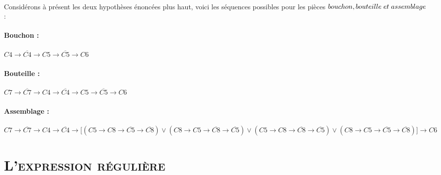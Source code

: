 		\paragraph{}
		Considérons à présent les deux hypothèses énoncées plus haut, voici les séquences possibles pour les pièces $bouchon, bouteille \hspace{1mm} et \hspace{1mm}  assemblage$ :
		\paragraph{Bouchon :}
		$C4 \rightarrow \overline{C4} \rightarrow C5 \rightarrow \overline{C5} \rightarrow C6$
		\paragraph{Bouteille :}
		$C7 \rightarrow \overline{C7} \rightarrow C4 \rightarrow \overline{C4} \rightarrow C5 \rightarrow 
		\overline{C5} \rightarrow C6$
		\paragraph{Assemblage :}
		$C7 \rightarrow \overline{C7} \rightarrow C4 \rightarrow \overline{C4} \rightarrow   \textbf{[} ( C5 \rightarrow 
		C8 \rightarrow \overline{C5} \rightarrow \overline{C8}) \vee (C8 \rightarrow 
		C5 \rightarrow \overline{C8} \rightarrow \overline{C5}) \vee (C5 \rightarrow 
		C8 \rightarrow \overline{C8} \rightarrow \overline{C5}) \vee ( C8 \rightarrow 
		C5 \rightarrow \overline{C5} \rightarrow \overline{C8} )\textbf{]} \rightarrow C6$
				
		\section{\textsc{L'expression régulière}}
		
